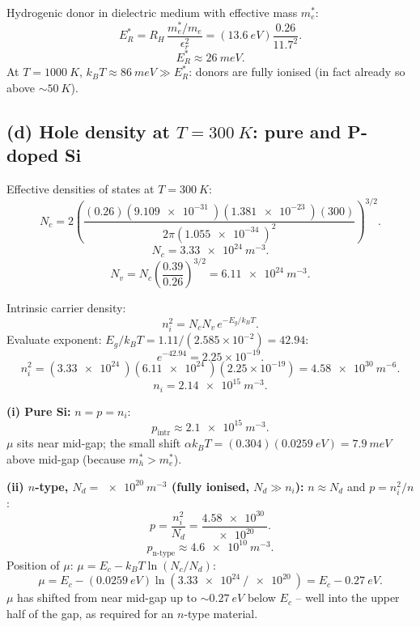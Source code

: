 \documentclass[11pt]{article}
\begin{document}
Hydrogenic donor in dielectric medium with effective mass $m_{e}^{*}$:
\[ E_{R}^{*} = R_{H}\,\frac{m_{e}^{*}/m_{e}}{\epsilon_{r}^{2}} = (\SI{13.6}{eV})\frac{0.26}{11.7^{2}}. \]
\[ \boxed{\;E_{R}^{*}\approx \SI{26}{meV}.\;} \]
At $T=\SI{1000}{K}$, $k_{B}T\approx \SI{86}{meV}\gg E_{R}^{*}$: donors are fully ionised (in fact already so above $\sim\SI{50}{K}$).

\subsection*{(d) Hole density at $T=\SI{300}{K}$: pure and P-doped Si}

Effective densities of states at $T=\SI{300}{K}$:
\[ N_{c} = 2\!\left(\frac{(0.26)(\SI{9.109e-31}{})(\SI{1.381e-23}{})(300)}{2\pi(\SI{1.055e-34}{})^{2}}\right)^{\!3/2}. \]
\[ N_{c} = \SI{3.33e24}{m^{-3}}. \]
\[ N_{v} = N_{c}\left(\frac{0.39}{0.26}\right)^{\!3/2} = \SI{6.11e24}{m^{-3}}. \]

Intrinsic carrier density:
\[ n_{i}^{2} = N_{c}N_{v}\,e^{-E_{g}/k_{B}T}. \]
Evaluate exponent: $E_{g}/k_{B}T = 1.11/(2.585\times 10^{-2}) = 42.94$:
\[ e^{-42.94} = 2.25\times 10^{-19}. \]
\[ n_{i}^{2} = (\SI{3.33e24}{})(\SI{6.11e24}{})(2.25\times 10^{-19}) = \SI{4.58e30}{m^{-6}}. \]
\[ n_{i} = \SI{2.14e15}{m^{-3}}. \]

\textbf{(i) Pure Si:} $n=p=n_{i}$:
\[ \boxed{\;p_{\text{intr}}\approx \SI{2.1e15}{m^{-3}}.\;} \]
$\mu$ sits near mid-gap; the small shift $\alpha k_{B}T = (0.304)(\SI{0.0259}{eV}) = \SI{7.9}{meV}$ above mid-gap (because $m_{h}^{*}>m_{e}^{*}$).

\textbf{(ii) $n$-type, $N_{d}=\SI{e20}{m^{-3}}$ (fully ionised, $N_{d}\gg n_{i}$):} $n\approx N_{d}$ and $p=n_{i}^{2}/n$:
\[ p = \frac{n_{i}^{2}}{N_{d}} = \frac{\SI{4.58e30}{}}{\SI{e20}{}}. \]
\[ \boxed{\;p_{\text{n-type}}\approx \SI{4.6e10}{m^{-3}}.\;} \]
Position of $\mu$: $\mu = E_{c} - k_{B}T\ln(N_{c}/N_{d})$:
\[ \mu = E_{c} - (\SI{0.0259}{eV})\ln(\SI{3.33e24}{}/\SI{e20}{}) = E_{c} - \SI{0.27}{eV}. \]
$\mu$ has shifted from near mid-gap up to $\sim\SI{0.27}{eV}$ below $E_{c}$ -- well into the upper half of the gap, as required for an $n$-type material.
\end{document}
